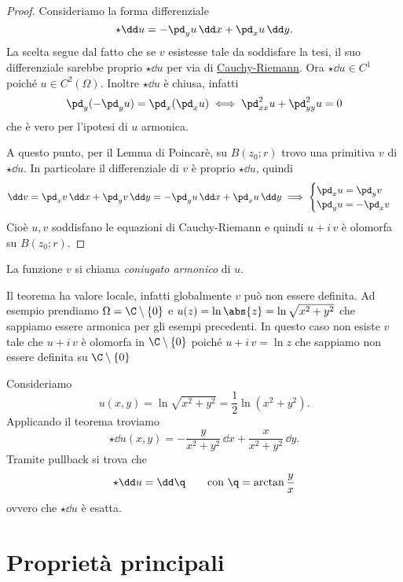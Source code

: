 \begin{proof}
	Consideriamo la forma differenziale
	\[
		\star\dd u = -\pd_y u\,\dd x + \pd_x u \,\dd y.
	\]
	La scelta segue dal fatto che se \(v\) esistesse tale da soddisfare la tesi, il suo differenziale sarebbe proprio \(\star\dd u\) per via di \hyperref[pr:equazioniCauchyRiemann]{Cauchy-Riemann}.
	Ora \(\star\dd u\in C^1\) poiché \(u\in C^2(\Omega)\). Inoltre \(\star\dd u\) è chiusa, infatti
	\[
		\pd_y (-\pd_y u) = \pd_x (\pd_x u) \iff \pd_{xx}^2 u + \pd_{yy}^2 u = 0
	\]
	che è vero per l'ipotesi di \(u\) armonica.
	
	A questo punto, per il Lemma di Poincarè, su \(B(z_0;r)\) trovo una primitiva \(v\) di \(\star\dd u\). In particolare il differenziale di \(v\) è proprio \(\star\dd u\), quindi
	\[
		\dd v = \pd_x v\,\dd x + \pd_y v\,\dd y = -\pd_y u\,\dd x + \pd_x u\,\dd y \implies \begin{cases}
			\pd_x u = \pd_y v \\
			\pd_y u = -\pd_x v
		\end{cases}
	\]
	Cioè \(u,v\) soddisfano le equazioni di Cauchy-Riemann e quindi \(u+i\,v\) è olomorfa su \(B(z_0;r)\).
\end{proof}

\begin{notz}
	La funzione \(v\) si chiama \emph{coniugato armonico} di \(u\).
\end{notz}

\begin{oss}
	Il teorema ha valore locale, infatti globalmente \(v\) può non essere definita.
	Ad esempio prendiamo \(\Omega=\C\setminus\{0\}\) e \(u(z)=\ln \abs{z} = \ln\sqrt{x^2+y^2}\) che sappiamo essere armonica per gli esempi precedenti. In questo caso non esiste \(v\) tale che \(u+i\,v\) è olomorfa in \(\C\setminus\{0\}\) poiché \(u+i\,v=\ln z\) che sappiamo non essere definita su \(\C\setminus\{0\}\)
\end{oss}

\begin{ese}
	Consideriamo
	\[
		u(x,y) = \ln \sqrt{x^2+y^2} = \frac{1}{2}\ln (x^2+y^2).
	\]
	Applicando il teorema troviamo
	\[
		\star\dd u (x,y) = -\frac{y}{x^2+y^2}\,\dd x + \frac{x}{x^2+y^2}\,\dd y.
	\]
	Tramite pullback si trova che
	\[
		\star\dd u = \dd \q \qquad\text{con }\q = \arctan \frac{y}{x}
	\]
	ovvero che \(\star\dd u\) è esatta.
\end{ese}
\section{Proprietà principali}

